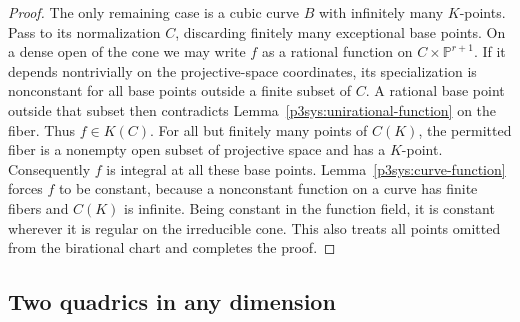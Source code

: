 \documentclass[11pt]{article}
\theoremstyle{definition}
\begin{document}
\begin{proof}
The only remaining case is a cubic curve $B$ with infinitely many
$K$-points.  Pass to its normalization $C$, discarding finitely
many exceptional base points.  On a dense open of the cone we may
write $f$ as a rational function on
$C\times\mathbb P^{r+1}$.  If it depends nontrivially on the
projective-space coordinates, its specialization is nonconstant
for all base points outside a finite subset of $C$.  A rational
base point outside that subset then contradicts
Lemma~\ref{p3sys:unirational-function} on the fiber.  Thus
$f\in K(C)$.  For all but finitely many points of $C(K)$, the
permitted fiber is a nonempty open subset of projective space and
has a $K$-point.  Consequently $f$ is integral at all these base
points.  Lemma~\ref{p3sys:curve-function} forces $f$ to be
constant, because a nonconstant function on a curve has finite
fibers and $C(K)$ is infinite.  Being constant in the function
field, it is constant wherever it is regular on the irreducible
cone.  This also treats all points omitted from the birational
chart and completes the proof.
\end{proof}

\subsection{Two quadrics in any dimension}
\end{document}

